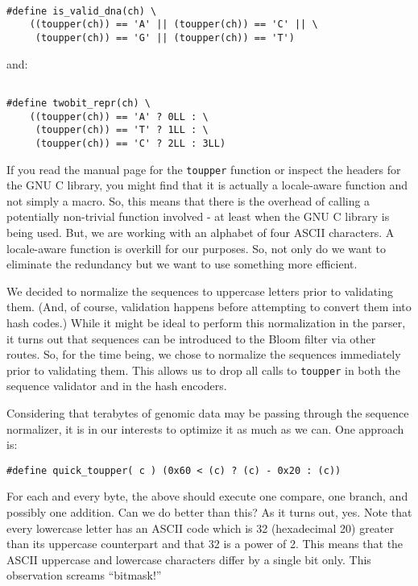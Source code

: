 \begin{verbatim}

#define is_valid_dna(ch) \
    ((toupper(ch)) == 'A' || (toupper(ch)) == 'C' || \
     (toupper(ch)) == 'G' || (toupper(ch)) == 'T')

\end{verbatim}

and:

\begin{verbatim}

#define twobit_repr(ch) \
    ((toupper(ch)) == 'A' ? 0LL : \
     (toupper(ch)) == 'T' ? 1LL : \
     (toupper(ch)) == 'C' ? 2LL : 3LL)

\end{verbatim}

If you read the manual page for the \texttt{toupper} function or inspect the
headers for the GNU C library, you might find that it is actually a
locale-aware function and not simply a macro. So, this means that there is the
overhead of calling a potentially non-trivial function involved - at least when
the GNU C library is being used. But, we are working with an alphabet of four
ASCII characters. A locale-aware function is overkill for our purposes.  So,
not only do we want to eliminate the redundancy but we want to use something
more efficient.

We decided to normalize the sequences to uppercase letters prior to validating
them. (And, of course, validation happens before attempting to convert them
into hash codes.) While it might be ideal to perform this normalization in the
parser, it turns out that sequences can be introduced to the Bloom filter via
other routes. So, for the time being, we chose to normalize the sequences
immediately prior to validating them. This allows us to drop all calls to
\texttt{toupper} in both the sequence validator and in the hash encoders.

Considering that terabytes of genomic data may be passing through the sequence
normalizer, it is in our interests to optimize it as much as we can. One
approach is:

\begin{verbatim}
#define quick_toupper( c ) (0x60 < (c) ? (c) - 0x20 : (c))
\end{verbatim}

For each and every byte, the above should execute one compare, one branch, and
possibly one addition. Can we do better than this? As it turns out, yes. Note
that every lowercase letter has an ASCII code which is 32 (hexadecimal 20)
greater than its uppercase counterpart and that 32 is a power of 2. This means
that the ASCII uppercase and lowercase characters differ by a single bit only.
This observation screams ``bitmask!''

